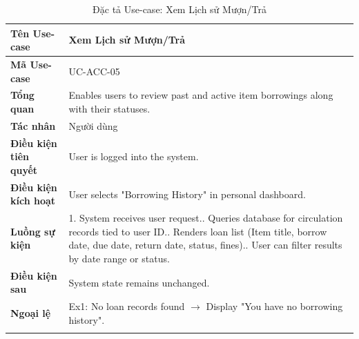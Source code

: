 \begin{longtable}{|p{3.5cm}|p{11.5cm}|}
    \hline
    \textbf{Tên Use-case} & \textbf{Xem Lịch sử Mượn/Trả} \\
    \hline
    \textbf{Mã Use-case} & UC-ACC-05 \\
    \hline
    \textbf{Tổng quan} & Enables users to review past and active item borrowings along with their statuses. \\
    \hline
    \textbf{Tác nhân} & Người dùng \\
    \hline
    \textbf{Điều kiện tiên quyết} & User is logged into the system. \\
    \hline
    \textbf{Điều kiện kích hoạt} & User selects "Borrowing History" in personal dashboard. \\
    \hline
    \textbf{Luồng sự kiện} & 
    1. System receives user request.\newline
    2. Queries database for circulation records tied to user ID.\newline
    3. Renders loan list (Item title, borrow date, due date, return date, status, fines).\newline
    4. User can filter results by date range or status. \\
    \hline
    \textbf{Điều kiện sau} & System state remains unchanged. \\
    \hline
    \textbf{Ngoại lệ} & 
    Ex1: No loan records found $\rightarrow$ Display "You have no borrowing history". \\
    \hline
    \caption{Đặc tả Use-case: Xem Lịch sử Mượn/Trả}
\end{longtable}

